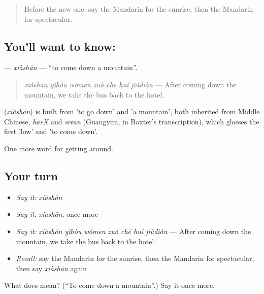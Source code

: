 \label{lesson:ZH-C435-xiashan}



\begin{quote}
Before the new one: say the Mandarin for the sunrise, then the Mandarin for spectacular.
\end{quote}

\subsection*{You'll want to know: }
\textbf{} — \emph{xiàshān} — \textquotedblleft{}to come down a mountain\textquotedblright{}.

\begin{quote}
\textbf{} \emph{xiàshān yǐhòu wǒmen zuò chē huí jiǔdiàn} — After coming down the mountain, we take the bus back to the hotel.
\end{quote}

\begin{cousinweb}
\textbf{} (\emph{xiàshān}) is built from  'to go down' and  'a mountain', both inherited from Middle Chinese, \emph{haeX} and \emph{srean} (Guangyun, in Baxter's transcription), which glosses the first 'low' and 'to come down'.
\end{cousinweb}

\begin{grammarlens}[title={What you've built}]
One more word for getting around.
\end{grammarlens}

\subsection*{Your turn}
\begin{itemize}
\raggedright
  \item \emph{Say it:} \emph{xiàshān}
  \item \emph{Say it:} \emph{xiàshān}, once more
  \item \emph{Say it:} \emph{xiàshān yǐhòu wǒmen zuò chē huí jiǔdiàn} — After coming down the mountain, we take the bus back to the hotel.
  \item \emph{Recall:} say the Mandarin for the sunrise, then the Mandarin for spectacular, then say \emph{xiàshān} again
\end{itemize}

\begin{tcolorbox}[breakable,colback=teal!4,colframe=teal!35!black,title={Before you move on}]
What does  mean? (\textquotedblleft{}To come down a mountain\textquotedblright{}.) Say it once more.
\end{tcolorbox}
